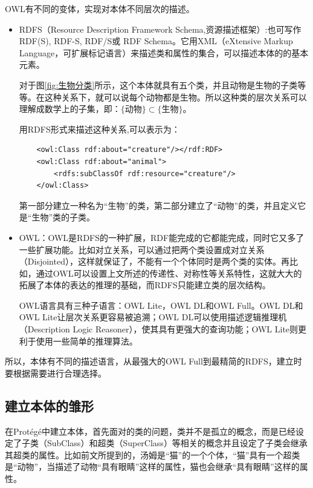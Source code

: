 \documentclass[12pt,a4paper]{article}
\begin{document}
	{\Times OWL}有不同的变体，实现对本体不同层次的描述。
	\begin{itemize}
		\item
	{\Times RDFS}（{\Times Resource Description Framework Schema},资源描述框架）:也可写作{\Times RDF(S),  RDF-S, RDF/S}或 {\Times RDF Schema}。它用{\Times XML}（{\Times eXtensive Markup Language}，可扩展标记语言）来描述类和属性的集合，可以描述本体的的基本元素。
	
	对于图\ref{fig:生物分类}所示，这个本体就具有五个类，并且动物是生物的子类等等。在这种关系下，就可以说每个动物都是生物。所以这种类的层次关系可以理解成数学上的子集，即：$ \{动物\} \subset \{生物\} $。
	
	用{\Times RDFS}形式来描述这种关系,可以表示为：
	\lstset{language=XML,frame=lines,basicstyle=\Times, commentstyle=\SimSun}
	
	\begin{lstlisting}
	<owl:Class rdf:about="creature"/></rdf:RDF>
	<owl:Class rdf:about="animal">
		<rdfs:subClassOf rdf:resource="creature"/>
	</owl:Class>
	\end{lstlisting}
	第一部分建立一种名为“生物”的类，第二部分建立了“动物”的类，并且定义它是“生物”类的子类。
		\item
	{\Times OWL}：{\Times OWL}是{\Times RDFS}的一种扩展，{\Times RDF}能完成的它都能完成，同时它又多了一些扩展功能。比如对立关系，可以通过把两个类设置成对立关系（{\Times Disjointed}），这样就保证了，不能有一个个体同时是两个类的实体。再比如，通过OWL可以设置上文所述的传递性、对称性等关系特性，这就大大的拓展了本体的表达的推理的基础，而{\Times RDFS}只能建立类的层次结构。
	
	{\Times OWL}语言具有三种子语言：{\Times OWL Lite}，{\Times OWL DL}和{\Times OWL Full}。{\Times OWL DL}和{\Times OWL Lite}让层次关系更容易被追溯；{\Times OWL DL}可以使用描述逻辑推理机（{\Times Description Logic Reasoner}），使其具有更强大的查询功能；{\Times OWL Lite}则更利于使用一些简单的推理算法。

	\end{itemize}
	
	所以，本体有不同的描述语言，从最强大的{\Times OWL Full}到最精简的{\Times RDFS}，建立时要根据需要进行合理选择。
	\subsection{建立本体的雏形}
	

	在{\Times Prot{\'e}g{\'e}}中建立本体，首先面对的类的问题，类并不是孤立的概念，而是已经设定了子类（{\Times SubClass}）和超类（{\Times SuperClass}）等相关的概念并且设定了子类会继承其超类的属性。比如前文所提到的，汤姆是“猫”的一个个体，“猫”具有一个超类是“动物”，当描述了动物“具有眼睛”这样的属性，猫也会继承“具有眼睛”这样的属性。
	
\end{document}
